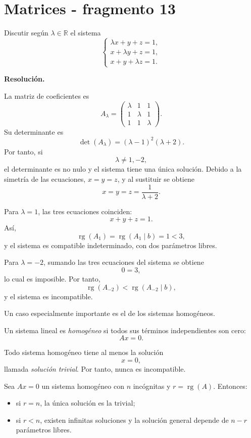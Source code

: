 \section{Matrices - fragmento 13}
\begin{solvedexercise}
Discutir según $\lambda\in\mathbb{R}$ el sistema
\[
\begin{cases}
\lambda x+y+z=1,\\
x+\lambda y+z=1,\\
x+y+\lambda z=1.
\end{cases}
\]

\textbf{Resolución.}\par\smallskip
La matriz de coeficientes es
\[
A_\lambda=
\begin{pmatrix}
\lambda&1&1\\
1&\lambda&1\\
1&1&\lambda
\end{pmatrix}.
\]
Su determinante es
\[
\det(A_\lambda)
=(\lambda-1)^2(\lambda+2).
\]
Por tanto, si
\[
\lambda\neq1,-2,
\]
el determinante es no nulo y el sistema tiene una única solución. Debido a la simetría de las ecuaciones, $x=y=z$, y al sustituir se obtiene
\[
\boxed{x=y=z=\frac{1}{\lambda+2}}.
\]

Para $\lambda=1$, las tres ecuaciones coinciden:
\[
x+y+z=1.
\]
Así,
\[
\operatorname{rg}(A_1)=\operatorname{rg}(A_1\mid b)=1<3,
\]
y el sistema es compatible indeterminado, con dos parámetros libres.

Para $\lambda=-2$, sumando las tres ecuaciones del sistema se obtiene
\[
0=3,
\]
lo cual es imposible. Por tanto,
\[
\operatorname{rg}(A_{-2})<\operatorname{rg}(A_{-2}\mid b),
\]
y el sistema es incompatible.
\end{solvedexercise}

Un caso especialmente importante es el de los sistemas homogéneos.

\begin{definition}
Un sistema lineal es \emph{homogéneo} si todos sus términos independientes son cero:
\[
Ax=0.
\]
\end{definition}

Todo sistema homogéneo tiene al menos la solución
\[
x=0,
\]
llamada \emph{solución trivial}. Por tanto, nunca es incompatible.

\begin{theorem}
Sea $Ax=0$ un sistema homogéneo con $n$ incógnitas y $r=\operatorname{rg}(A)$. Entonces:
\begin{itemize}
\item si $r=n$, la única solución es la trivial;
\item si $r<n$, existen infinitas soluciones y la solución general depende de $n-r$ parámetros libres.
\end{itemize}
\end{theorem}


